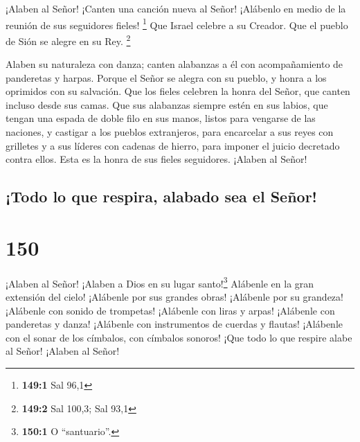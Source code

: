  ¡Alaben al Señor! ¡Canten una canción nueva al Señor!
¡Alábenlo en medio de la reunión de sus seguidores fieles! \footnote{\textbf{149:1}
  Sal 96,1}  Que Israel celebre a su Creador. Que el
pueblo de Sión se alegre en su Rey. \footnote{\textbf{149:2} Sal 100,3;
  Sal 93,1}

 Alaben su naturaleza con danza; canten alabanzas a él con
acompañamiento de panderetas y harpas.  Porque el Señor se
alegra con su pueblo, y honra a los oprimidos con su salvación.
 Que los fieles celebren la honra del Señor, que canten
incluso desde sus camas.  Que sus alabanzas siempre estén
en sus labios, que tengan una espada de doble filo en sus manos,
 listos para vengarse de las naciones, y castigar a los
pueblos extranjeros,  para encarcelar a sus reyes con
grilletes y a sus líderes con cadenas de hierro,  para
imponer el juicio decretado contra ellos. Esta es la honra de sus fieles
seguidores. ¡Alaben al Señor!

\hypertarget{todo-lo-que-respira-alabado-sea-el-seuxf1or}{%
\subsection{¡Todo lo que respira, alabado sea el
Señor!}\label{todo-lo-que-respira-alabado-sea-el-seuxf1or}}

\hypertarget{section-149}{%
\section{150}\label{section-149}}

 ¡Alaben al Señor! ¡Alaben a Dios en su lugar
santo!\footnote{\textbf{150:1} O ``santuario''.} Alábenle en la gran
extensión del cielo!  ¡Alábenle por sus grandes obras!
¡Alábenle por su grandeza!  ¡Alábenle con sonido de
trompetas! ¡Alábenle con liras y arpas!  ¡Alábenle con
panderetas y danza! ¡Alábenle con instrumentos de cuerdas y flautas!
 ¡Alábenle con el sonar de los címbalos, con címbalos
sonoros!  ¡Que todo lo que respire alabe al Señor! ¡Alaben
al Señor!
